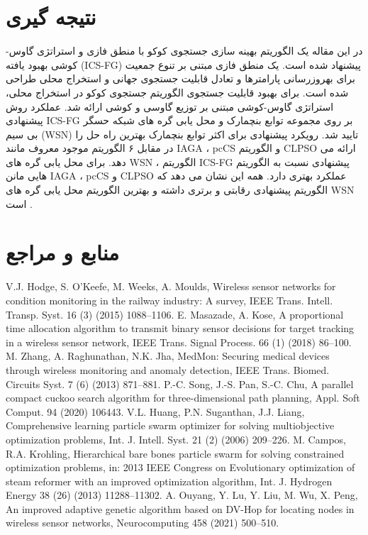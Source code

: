\documentclass{CSICC2020}
\begin{document}
\section{نتیجه گیری}
در این مقاله یک الگوریتم بهینه سازی جستجوی کوکو با منطق فازی و استراتژی گاوس-کوشی بهبود یافته (ICS-FG) پیشنهاد شده است. یک منطق فازی مبتنی بر تنوع جمعیت برای بهروزرسانی پارامترها و تعادل قابلیت جستجوی جهانی و استخراج محلی طراحی شده است. برای بهبود قابلیت جستجوی الگوریتم جستجوی کوکو در استخراج محلی، استراتژی گاوس-کوشی مبتنی بر توزیع گاوسی و کوشی ارائه شد. عملکرد روش پیشنهادی ICS-FG بر روی مجموعه توابع بنچمارک و محل یابی گره های شبکه حسگر بی سیم (WSN) تایید شد. رویکرد پیشنهادی برای اکثر توابع بنچمارک بهترین راه حل را در مقابل ۶ الگوریتم موجود معروف مانند IAGA ، pcCS و الگوریتم CLPSO ارائه می دهد. برای محل یابی گره های WSN ، الگوریتم ICS-FG پیشنهادی نسبت به الگوریتم هایی مانن IAGA  ، pcCS و  CLPSO عملکرد بهتری دارد. همه این نشان می دهد که الگوریتم پیشنهادی رقابتی و  برتری داشته و بهترین الگوریتم محل یابی گره های WSN است .


\section{منابع و مراجع}

 V.J. Hodge, S. O’Keefe, M. Weeks, A. Moulds, Wireless sensor networks for
condition monitoring in the railway industry: A survey, IEEE Trans. Intell. Transp.
Syst. 16 (3) (2015) 1088–1106.
 E. Masazade, A. Kose, A proportional time allocation algorithm to transmit binary
sensor decisions for target tracking in a wireless sensor network, IEEE Trans.
Signal Process. 66 (1) (2018) 86–100.
 M. Zhang, A. Raghunathan, N.K. Jha, MedMon: Securing medical devices through
wireless monitoring and anomaly detection, IEEE Trans. Biomed. Circuits Syst. 7
(6) (2013) 871–881.
 P.-C. Song, J.-S. Pan, S.-C. Chu, A parallel compact cuckoo search algorithm for
three-dimensional path planning, Appl. Soft Comput. 94 (2020) 106443.
 V.L. Huang, P.N. Suganthan, J.J. Liang, Comprehensive learning particle swarm
optimizer for solving multiobjective optimization problems, Int. J. Intell. Syst. 21
(2) (2006) 209–226.
 M. Campos, R.A. Krohling, Hierarchical bare bones particle swarm for solving
constrained optimization problems, in: 2013 IEEE Congress on Evolutionary
optimization of steam reformer with an improved optimization algorithm, Int. J.
Hydrogen Energy 38 (26) (2013) 11288–11302.
 A. Ouyang, Y. Lu, Y. Liu, M. Wu, X. Peng, An improved adaptive genetic algorithm
based on DV-Hop for locating nodes in wireless sensor networks, Neurocomputing
458 (2021) 500–510.
\end{document}
